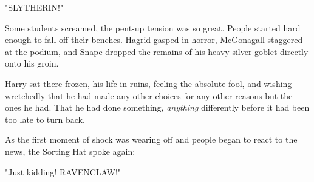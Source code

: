 "SLYTHERIN!"

Some students screamed, the pent-up tension was so great. People started hard
enough to fall off their benches. Hagrid gasped in horror, McGonagall staggered
at the podium, and Snape dropped the remains of his heavy silver goblet
directly onto his groin.

Harry sat there frozen, his life in ruins, feeling the absolute fool, and
wishing wretchedly that he had made any other choices for any other reasons but
the ones he had. That he had done something, \emph{anything} differently before
it had been too late to turn back.

As the first moment of shock was wearing off and people began to react to the
news, the Sorting Hat spoke again:

"Just kidding! RAVENCLAW!"
